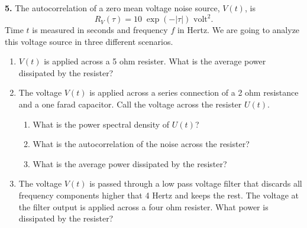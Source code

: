 \textbf{5.} The autocorrelation of a zero mean voltage noise source, $V(t)$, is
  $$ R_V (\tau ) = 10 \; \exp(-|\tau|)\mbox{ volt}^2.$$
  Time $t$ is measured in seconds and frequency $f$ in Hertz. We are going to analyze this voltage source in three different scenarios.
  \begin{enumerate}
  \item $V(t)$ is applied across a 5 ohm resister. What is the average power dissipated by the resister?


  \item  The voltage $V(t)$ is applied across a series connection of a 2 ohm resistance and a one farad capacitor. Call the voltage across the resister $U(t)$.
    \begin{enumerate}
    \item What is the power spectral density of $U(t)$?

    \item What is the autocorrelation of the noise across the resister?

    \item What is the average power dissipated by the resister?


    \end{enumerate}
  \item The voltage $V(t)$ is passed through a low pass voltage filter that discards all frequency components higher that 4 Hertz and keeps the rest. The voltage at the filter output is applied across a four ohm resister. What power is dissipated by the resister?
  \end{enumerate}

